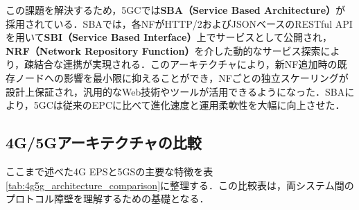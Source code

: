 この課題を解決するため，5GCでは\textbf{SBA（Service Based Architecture）}が採用されている\cite{3GPP_TS23501_R15}．SBAでは，各NFがHTTP/2およびJSONベースのRESTful APIを用いて\textbf{SBI（Service Based Interface）}上でサービスとして公開され，\textbf{NRF（Network Repository Function）}を介した動的なサービス探索により，疎結合な連携が実現される．このアーキテクチャにより，新NF追加時の既存ノードへの影響を最小限に抑えることができ，NFごとの独立スケーリングが設計上保証され，汎用的なWeb技術やツールが活用できるようになった．SBAにより，5GCは従来のEPCに比べて進化速度と運用柔軟性を大幅に向上させた．

\subsection{4G/5Gアーキテクチャの比較}
\label{subsec:4g5g_comparison}

ここまで述べた4G EPSと5GSの主要な特徴を表\ref{tab:4g5g_architecture_comparison}に整理する．この比較表は，両システム間のプロトコル障壁を理解するための基礎となる．

